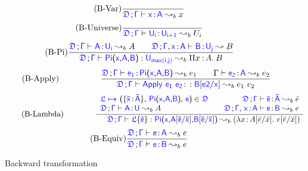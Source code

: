 \begin{figure}
	\begin{equation}
		\tag{B-Var}
		\frac
			{}
			{\targetcon \vdash \target{x} \goodcolon \target{A} \leadsto_b x}
	\end{equation} \hspace{0.5cm}
	\begin{equation}
		\tag{B-Universe}
		\frac
			{}
			{\targetcon \vdash \target{U_i} \goodcolon \target{U_{i+1}} \leadsto_b U_i}
	\end{equation} \hspace{0.5cm}
	\begin{equation}
		\tag{B-Pi}
		\frac
			{\targetcon \vdash \target{A} \goodcolon \target{U_i} \leadsto_b {A} \qquad \targetcon, \target{x} \goodcolon \target{A} \vdash \target{B} \goodcolon \target{U_j} \leadsto B
			}
			{\targetcon \vdash \targetpi{x}{A}{B} \mathrel{:} \target{U_{max(i, j)}} \leadsto_b \pitype{x}{A}{B}}
	\end{equation} \hspace{0.5cm}
	\begin{equation}
		\tag{B-Apply}
		\qquad\qquad\quad
		\frac
			{\targetcon \vdash \target{e_1} \goodcolon \targetpi{x}{A}{B} \leadsto_b e_1 \qquad \Gamma \vdash \target{e_2} \goodcolon \target{A} \leadsto_b e_2}
			{\targetcon \vdash \targetapp{e_1}{e_2} \goodcolon  \mathrel{:} \target{B}\sub{\target{e2}}{\target{x}} \leadsto_b e_1 \ e_2 }
	\end{equation} \hspace{0.5cm}
	\begin{equation}
		\tag{B-Lambda}
		\qquad\qquad
		\frac
			{\begin{array}{l @{\qquad} r}
			  	\itemdef{\target{\flabel}}{\itemtype{\bar{x}}{\bar{A}}}{\targetpi{x}{A}{B}}{\target{e}} \in \target{\fdef} &
			  	\targetcon \vdash \itemtype{\bar{e}}{\bar{A}} \leadsto_b \bar{e} \\
			  	\targetcon \vdash \itemtype{A}{U} \leadsto_b A &
			  	\targetcon \sfcomma \itemtype{x}{A} \vdash \itemtype{e}{B} \leadsto_b e \\
			 \end{array}	 
			}
			{\quad \target{\fdef}\semicolon \target{\Gamma} \vdash \targetlab{\flabel}{\bar{e}} \mathrel{:} 
			 \target{Pi}\textsf{(}\target{x}\textsf{,} \target{A} \targetsub{\bar{e}}{\bar{x}}\textsf{,} \target{B} \targetsub{\bar{e}}{\bar{x}}\textsf{)} \leadsto_b (\lam{x}{A\sub{\bar{e}}{\bar{x}}}{e\sub{\bar{e}}{\bar{x}}})
			}
	\end{equation} \hspace{0.5cm}
	\begin{equation}
		\tag{B-Equiv}
		\frac
			{\targetcon \vdash \target{e} \goodcolon \target{A} \leadsto_b e}
			{\targetcon \vdash \target{e} \goodcolon \target{B} \leadsto_b e}
	\end{equation}
	\caption{Backward transformation}
    \label{fig:backward transformation}
\end{figure}

